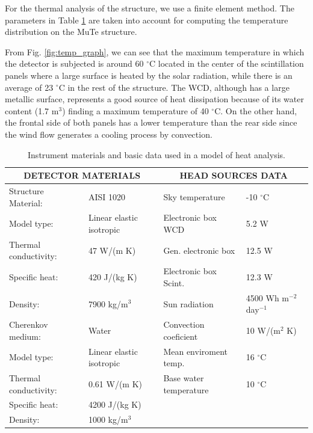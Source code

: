 \documentclass[letterpaper,11pt]{article}
\begin{document}
For the thermal analysis of the structure, we use a finite element method. The parameters in Table \ref{instr_mat} are taken into account for computing the temperature distribution on the MuTe structure. 

From Fig. \ref{fig:temp_graph}, we can see that the maximum temperature in which the detector is subjected is around 60 $^{\circ}$C located in the center of the scintillation panels where a large surface is heated by the solar radiation, while there is an average of 23 $^{\circ}$C in the rest of the structure. The WCD, although has a large metallic surface, represents a good source of heat dissipation because of its water content (1.7 m$^3$) finding a maximum temperature of 40 $^{\circ}$C. On the other hand, the frontal side of both panels has a lower temperature than the rear side since the wind flow generates a cooling process by convection.

\begin{table}[!ht]
\begin{center}
\begin{tabular}{ll|ll}
\hline
\multicolumn{2}{c}{\bf DETECTOR MATERIALS} & \multicolumn{2}{|c}{\bf HEAD SOURCES DATA}\\
\hline
Structure Material: & AISI 1020 & Sky temperature & -10 $^{\circ}$C \\
Model type: & Linear elastic isotropic & Electronic box WCD & 5.2 W \\
Thermal conductivity: & 47 W/(m K) & Gen. electronic box & 12.5 W \\
Specific heat: & 420 J/(kg K) & Electronic box Scint. & 12.3 W \\
Density: & 7900 kg/m$^3$ & Sun radiation & 4500 Wh m$^{-2}$ day$^{-1}$ \\
Cherenkov medium: & Water & Convection coeficient & 10 W/(m$^2$ K) \\
Model type: & Linear elastic isotropic & Mean enviroment temp. & 16 $^{\circ}$C \\
Thermal conductivity: & 0.61 W/(m K) & Base water temperature & 10 $^{\circ}$C \\
Specific heat: & 4200 J/(kg K) & & \\
Density: & 1000 kg/m$^3$ & & \\ 
\hline
\end{tabular}
\end{center}
\caption{Instrument materials and basic data used in a model of heat analysis.}
\label{instr_mat}
\end{table}
\end{document}
